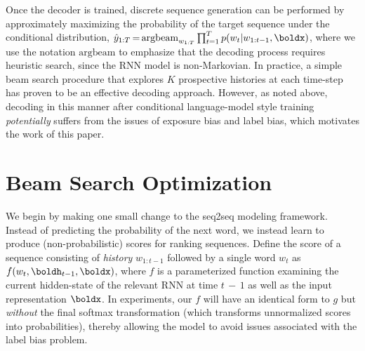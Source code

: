 \documentclass[11pt,letterpaper]{article}
\newcommand{\pfx}[1]{\ensuremath{w_{1:{#1}}}}
\newcommand{\niceq}{\ensuremath{\,{=}\,}}
\begin{document}
Once the decoder is trained, discrete sequence generation can be
performed by approximately maximizing the probability of the target
sequence under the conditional distribution,
$\hat{y}_{1:T} \niceq \mathrm{argbeam}_{w_{1:T}} \prod_{t=1}^{T} p(w_t |\pfx{t-1}, \boldx)$, where we use the notation $\mathrm{argbeam}$ to emphasize that the decoding process requires heuristic search, since the RNN model is non-Markovian. In practice, a simple beam search
procedure that explores $K$ prospective histories at each time-step
has proven to be an effective decoding approach. However, as noted above,
decoding in this manner after conditional language-model style training \textit{potentially} suffers from the issues of exposure bias and label bias, which motivates the work of this paper.







  





























 
\section{Beam Search Optimization}
We begin by making one small change to the seq2seq modeling
framework. Instead of predicting the probability of the next
word, we instead learn to produce (non-probabilistic) scores
for ranking sequences. Define the score of a sequence consisting of 
\textit{history} $\pfx{t-1}$ followed by a single word $w_{t}$ as $f(w_{t}, \boldh_{t-1}, \boldx)$,
where $f$ is a parameterized function examining the current
hidden-state of the relevant RNN at time $t\,{-}\,1$ as well as the input
representation $\boldx$. In experiments, our $f$ will have an identical 
form to $g$ but \textit{without} the final softmax transformation (which transforms unnormalized scores into probabilities),  thereby allowing the model to avoid issues associated with the label bias
problem.
\end{document}

